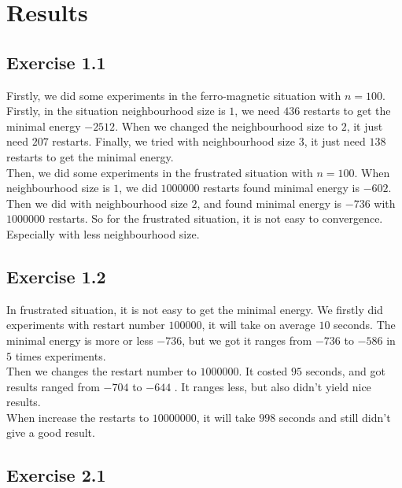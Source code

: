 \documentclass[10pt,a4paper]{article}
\begin{document}
\section{Results}
\subsection{Exercise 1.1}
Firstly, we did some experiments in the ferro-magnetic situation with $n=100$. Firstly, in the situation neighbourhood size is $1$, we need $436$ restarts to get the minimal energy $-2512$. When we changed the neighbourhood size to $2$, it just need $207$ restarts. Finally, we tried with neighbourhood size $3$, it just need $138$ restarts to get the minimal energy.\\
Then, we did some experiments in the frustrated situation with $n=100$. When neighbourhood size is $1$, we did $1000000$ restarts found minimal energy is $-602$. Then we did with neighbourhood size $2$, and found minimal energy is $-736$ with $1000000$ restarts. So for the frustrated situation, it is not easy to convergence. Especially with less neighbourhood size.
\subsection{Exercise 1.2}
In frustrated situation, it is not easy to get the minimal energy.
We firstly did experiments with restart number $100000$, it will take on average $10$ seconds. The minimal energy is more or less $-736$, but we got it ranges from $-736$ to $-586$ in $5$ times experiments.\\
Then we changes the restart number to $1000000$. It costed $95$ seconds, and got results ranged from $-704$ to $-644$ . It ranges less, but also didn't yield nice results. \\
When increase the restarts to $10000000$, it will take $998$ seconds and still didn't give a good result.

\subsection{Exercise 2.1}
\end{document}
